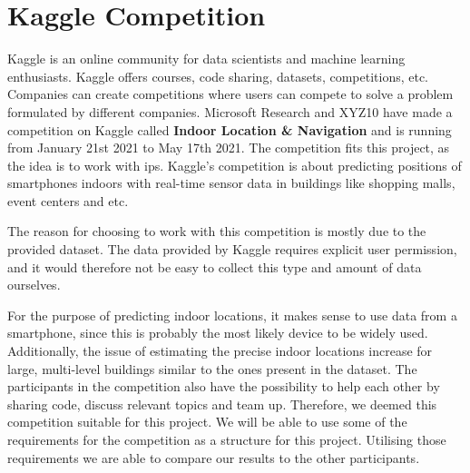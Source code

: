 \section{Kaggle Competition}
\label{sec:kaggleComp}
Kaggle is an online community for data scientists and machine learning enthusiasts. Kaggle offers courses, code sharing, datasets, competitions, etc. Companies can create competitions where users can compete to solve a problem formulated by different companies. Microsoft Research and XYZ10 have made a competition on Kaggle called \textbf{Indoor Location \& Navigation} and is running from January 21st 2021 to May 17th 2021. The competition fits this project, as the idea is to work with \gls{ips}. Kaggle's competition is about predicting positions of smartphones indoors with real-time sensor data in buildings like shopping malls, event centers and etc.

The reason for choosing to work with this competition is mostly due to the provided dataset. The data provided by Kaggle requires explicit user permission\cite{CompetitionSite}, and it would therefore not be easy to collect this type and amount of data ourselves.

For the purpose of predicting indoor locations, it makes sense to use data from a smartphone, since this is probably the most likely device to be widely used. Additionally, the issue of estimating the precise indoor locations increase for large, multi-level buildings similar to the ones present in the dataset.
The participants in the competition also have the possibility to help each other by sharing code, discuss relevant topics and team up. Therefore, we deemed this competition suitable for this project. We will be able to use some of the requirements for the competition as a structure for this project. Utilising those requirements we are able to compare our results to the other participants.

